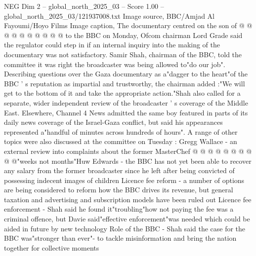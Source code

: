\begin{textsample}{NEG Dim 2 – global\_north\_2025\_03 – Score 1.00 – global\_north\_2025\_03/121937008.txt}
Image source, BBC/Amjad Al Fayoumi/Hoyo Films Image caption, The documentary centred on the son of @ @ @ @ @ @ @ @ @ @ to the BBC on Monday, Ofcom chairman Lord Grade said the regulator could step in if an internal inquiry into the making of the documentary was not satisfactory.
Samir Shah, chairman of the BBC, told the committee it was right the broadcaster was being allowed to"do our job".
Describing questions over the Gaza documentary as a"dagger to the heart"of the BBC ' s reputation as impartial and trustworthy, the chairman added :"We will get to the bottom of it and take the appropriate action."Shah also called for a separate, wider independent review of the broadcaster ' s coverage of the Middle East.
Elsewhere, Channel 4 News admitted the same boy featured in parts of its daily news coverage of the Israel-Gaza conflict, but said his appearances represented a"handful of minutes across hundreds of hours".
A range of other topics were also discussed at the committee on Tuesday : Gregg Wallace - an external review into complaints about the former MasterChef @ @ @ @ @ @ @ @ @ @"weeks not months"Huw Edwards - the BBC has not yet been able to recover any salary from the former broadcaster since he left after being convicted of possessing indecent images of children Licence fee reform - a number of options are being considered to reform how the BBC drives its revenue, but general taxation and advertising and subscription models have been ruled out Licence fee enforcement - Shah said he found it"troubling"how not paying the fee was a criminal offence, but Davie said"effective enforcement"was needed which could be aided in future by new technology Role of the BBC - Shah said the case for the BBC was"stronger than ever"- to tackle misinformation and bring the nation together for collective moments

\end{textsample}
